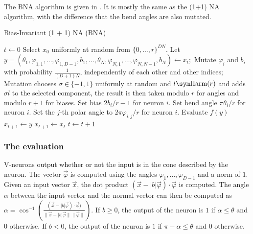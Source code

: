The BNA algorithm is given in .
It is mostly the same as the (1+1) NA algorithm, with the difference that the bend angles are also mutated.

\begin{algorithm}
    \caption{Bias-Invariant (1 + 1) NA (BNA)}
\label{alg:bna}
\begin{algorithmic}
    \State $t \gets 0$
    \State Select $x_0$ uniformly at random from $\{0, \ldots, r\}^{DN}$.
        \State Let $y = (\theta_1, \varphi_{1,1}, \ldots, \varphi_{1,D-1}, b_1, \ldots, \theta_N, \varphi_{N,1}, \ldots, \varphi_{N,N-1}, b_N) \gets x_t;$
            \State Mutate $\varphi_i$ and $b_i$ with probability $\frac{1}{(D+1) N}$, independently of each other and other indices;
            \State Mutation chooses $\sigma \in \{-1, 1\}$ uniformly at random and $l \sym \text{Harm}(r)$ and adds $\sigma l$ to the selected component, the
            result is then taken modulo $r$ for angles and modulo $r + 1$ for biases.
                \State Set bias $2b_i / r - 1$ for neuron $i$.
                \State Set bend angle $\pi \theta_i / r$ for neuron $i$.
                    \State Set the $j$-th polar angle to $2\pi \varphi_{i,j} / r$ for neuron $i$.
                \EndFor
            \EndFor
            \State Evaluate $f(y)$
                \State $x_{t+1} \gets y$
            \Else
                \State $x_{t+1} \gets x_t$
            \EndIf
        \EndFor
        \State $t \gets t + 1$
    \EndWhile
\end{algorithmic}
\end{algorithm}

\subsubsection{The evaluation}

V-neurons output whether or not the input is in the cone described by the neuron. The vector $\overrightarrow{\varphi}$ is computed using the angles $\varphi_1, \ldots, \varphi_{D-1}$
and a norm of $1$. Given an input vector $\overrightarrow{x}$, the dot product $(\overrightarrow{x} - \lvert b \rvert \overrightarrow{\varphi}) \cdot \overrightarrow{\varphi}$ is computed.
The angle $\alpha$ between the input vector and the normal vector can then be computed as
$\alpha = \cos^{-1}(\frac{(\overrightarrow{x} - \lvert b \rvert \overrightarrow{\varphi}) \cdot \overrightarrow{\varphi})}{\lVert \overrightarrow{x} - \lvert b \rvert \overrightarrow{\varphi} \rVert
\lVert \overrightarrow{\varphi} \rVert})$. If $b \geq 0$, the output of the neuron is $1$ if $\alpha \leq \theta$ and $0$ otherwise. If $b < 0$, the output of the neuron is
$1$ if $\pi - \alpha \leq \theta$ and $0$ otherwise.

